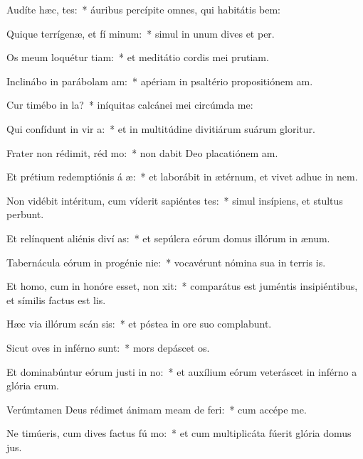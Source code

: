 \item Audíte hæc,  tes:~* áuribus percípite omnes, qui habitátis bem:
\item Quique terrígenæ, et fí minum:~* simul in unum dives et per.
\item Os meum loquétur tiam:~* et meditátio cordis mei prutiam.
\item Inclinábo in parábolam  am:~* apériam in psaltério propositiónem am.
\item Cur timébo in  la?~* iníquitas calcánei mei circúmda me:
\item Qui confídunt in vir a:~* et in multitúdine divitiárum suárum gloritur.
\item Frater non rédimit, réd mo:~* non dabit Deo placatiónem am.
\item Et prétium redemptiónis á æ:~* et laborábit in ætérnum, et vivet adhuc in nem.
\item Non vidébit intéritum, cum víderit sapiéntes tes:~* simul insípiens, et stultus perbunt.
\item Et relínquent aliénis diví as:~* et sepúlcra eórum domus illórum in ænum.
\item Tabernácula eórum in progénie  nie:~* vocavérunt nómina sua in terris is.
\item Et homo, cum in honóre esset, non xit:~* comparátus est juméntis insipiéntibus, et símilis factus est lis.
\item Hæc via illórum scán sis:~* et póstea in ore suo complabunt.
\item Sicut oves in inférno  sunt:~* mors depáscet os.
\item Et dominabúntur eórum justi in no:~* et auxílium eórum veteráscet in inférno a glória erum.
\item Verúmtamen Deus rédimet ánimam meam de  feri:~* cum accépe me.
\item Ne timúeris, cum dives factus fú mo:~* et cum multiplicáta fúerit glória domus jus.
